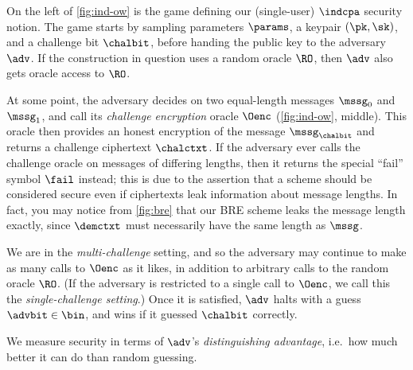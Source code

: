       On the left of \cref{fig:ind-ow} 
      is the game
        defining our (single-user) $\indcpa$ security notion. The game starts by sampling
        parameters $\params$,
        a keypair
        $(\pk,\sk)$, and a challenge bit $\chalbit$, before handing the public
        key to the adversary $\adv$. If the construction in question uses a
        random oracle $\RO$, then $\adv$ also gets oracle access to $\RO$.

      At some point, the adversary decides on two equal-length messages
        $\mssg_0$ and $\mssg_1$, and call its \emph{challenge encryption} oracle $\Oenc$
        (\cref{fig:ind-ow}, middle). This oracle then provides an honest
        encryption of the message $\mssg_{\chalbit}$ and returns a challenge
        ciphertext $\chalctxt$. If the adversary ever calls
        the challenge oracle on messages of differing lengths, then it returns the
        special ``fail'' symbol $\fail$ instead; this is due to the
        assertion that a scheme should be considered
        secure even if ciphertexts leak information about message lengths.
        In fact, you may notice from \cref{fig:bre} 
        that
        our BRE scheme  leaks the message length exactly, since $\demctxt$
        must necessarily have the same length as $\mssg$.

      We are in the \emph{multi-challenge} setting, and so the adversary may
        continue to make as many calls to $\Oenc$ as it likes,
        in addition to arbitrary calls to the random oracle $\RO$.
        (If the adversary is restricted to a single call to $\Oenc$, we call this
        the \emph{single-challenge setting}.)
        Once it is satisfied, $\adv$ halts with a guess $\advbit \in
        \bin$, and wins if it guessed $\chalbit$ correctly.

      We measure security in terms of $\adv$'s \emph{distinguishing advantage},
        i.e.\ how much better it can do than random guessing.

